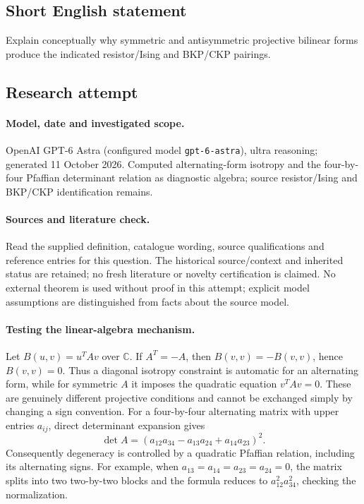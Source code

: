 \documentclass[11pt]{article}
\begin{document}
\subsection{Short English statement}
Explain conceptually why symmetric and antisymmetric projective bilinear forms produce the indicated resistor/Ising and BKP/CKP pairings.
\subsection{Research attempt}
\paragraph{Model, date and investigated scope.}
OpenAI GPT-6 Astra (configured model \texttt{gpt-6-astra}), ultra reasoning; generated 11 October 2026. Computed alternating-form isotropy and the four-by-four Pfaffian determinant relation as diagnostic algebra; source resistor/Ising and BKP/CKP identification remains.

\paragraph{Sources and literature check.}
Read the supplied definition, catalogue wording, source qualifications and reference entries for this question. The historical source/context and inherited status are retained; no fresh literature or novelty certification is claimed. No external theorem is used without proof in this attempt; explicit model assumptions are distinguished from facts about the source model.

\paragraph{Testing the linear-algebra mechanism.} Let \(B(u,v)=u^TAv\) over \(\mathbb C\). If \(A^T=-A\), then \(B(v,v)=-B(v,v)\), hence \(B(v,v)=0\). Thus a diagonal isotropy constraint is automatic for an alternating form, while for symmetric \(A\) it imposes the quadratic equation \(v^TAv=0\). These are genuinely different projective conditions and cannot be exchanged simply by changing a sign convention.
For a four-by-four alternating matrix with upper entries \(a_{ij}\), direct determinant expansion gives
\[
 \det A=(a_{12}a_{34}-a_{13}a_{24}+a_{14}a_{23})^2.
\]
Consequently degeneracy is controlled by a quadratic Pfaffian relation, including its alternating signs. For example, when \(a_{13}=a_{14}=a_{23}=a_{24}=0\), the matrix splits into two two-by-two blocks and the formula reduces to \(a_{12}^2a_{34}^2\), checking the normalization.
\end{document}
